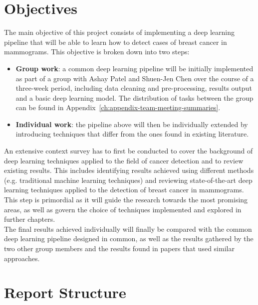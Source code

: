 
\section{Objectives}
\label{sec:introduction-objectives}

The main objective of this project consists of implementing a deep learning pipeline that will be able to learn how to detect cases of breast cancer in mammograms. This objective is broken down into two steps:
\begin{itemize}
    \item \textbf{Group work}: a common deep learning pipeline will be initially implemented as part of a group with Ashay Patel and Shuen-Jen Chen over the course of a three-week period, including data cleaning and pre-processing, results output and a basic deep learning model. The distribution of tasks between the group can be found in Appendix~\ref{ch:appendix-team-meeting-summaries}.
    \item \textbf{Individual work}: the pipeline above will then be individually extended by introducing techniques that differ from the ones found in existing literature.
\end{itemize}

An extensive context survey has to first be conducted to cover the background of deep learning techniques applied to the field of cancer detection and to review existing results. This includes identifying results achieved using different methods (e.g. traditional machine learning techniques) and reviewing state-of-the-art deep learning techniques applied to the detection of breast cancer in mammograms. This step is primordial as it will guide the research towards the most promising areas, as well as govern the choice of techniques implemented and explored in further chapters.\\

The final results achieved individually will finally be compared with the common deep learning pipeline designed in common, as well as the results gathered by the two other group members and the results found in papers that used similar approaches.


\section{Report Structure}


